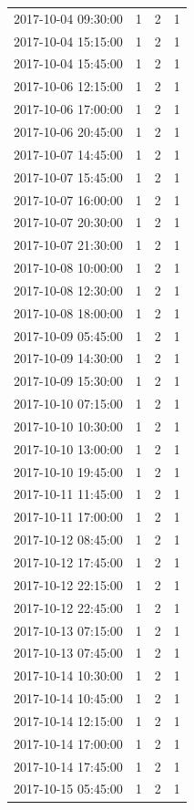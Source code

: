 \begin{tabular}{lrrr}
2017-10-04 09:30:00 & 1 & 2 & 1 \\
2017-10-04 15:15:00 & 1 & 2 & 1 \\
2017-10-04 15:45:00 & 1 & 2 & 1 \\
2017-10-06 12:15:00 & 1 & 2 & 1 \\
2017-10-06 17:00:00 & 1 & 2 & 1 \\
2017-10-06 20:45:00 & 1 & 2 & 1 \\
2017-10-07 14:45:00 & 1 & 2 & 1 \\
2017-10-07 15:45:00 & 1 & 2 & 1 \\
2017-10-07 16:00:00 & 1 & 2 & 1 \\
2017-10-07 20:30:00 & 1 & 2 & 1 \\
2017-10-07 21:30:00 & 1 & 2 & 1 \\
2017-10-08 10:00:00 & 1 & 2 & 1 \\
2017-10-08 12:30:00 & 1 & 2 & 1 \\
2017-10-08 18:00:00 & 1 & 2 & 1 \\
2017-10-09 05:45:00 & 1 & 2 & 1 \\
2017-10-09 14:30:00 & 1 & 2 & 1 \\
2017-10-09 15:30:00 & 1 & 2 & 1 \\
2017-10-10 07:15:00 & 1 & 2 & 1 \\
2017-10-10 10:30:00 & 1 & 2 & 1 \\
2017-10-10 13:00:00 & 1 & 2 & 1 \\
2017-10-10 19:45:00 & 1 & 2 & 1 \\
2017-10-11 11:45:00 & 1 & 2 & 1 \\
2017-10-11 17:00:00 & 1 & 2 & 1 \\
2017-10-12 08:45:00 & 1 & 2 & 1 \\
2017-10-12 17:45:00 & 1 & 2 & 1 \\
2017-10-12 22:15:00 & 1 & 2 & 1 \\
2017-10-12 22:45:00 & 1 & 2 & 1 \\
2017-10-13 07:15:00 & 1 & 2 & 1 \\
2017-10-13 07:45:00 & 1 & 2 & 1 \\
2017-10-14 10:30:00 & 1 & 2 & 1 \\
2017-10-14 10:45:00 & 1 & 2 & 1 \\
2017-10-14 12:15:00 & 1 & 2 & 1 \\
2017-10-14 17:00:00 & 1 & 2 & 1 \\
2017-10-14 17:45:00 & 1 & 2 & 1 \\
2017-10-15 05:45:00 & 1 & 2 & 1 \\

\end{tabular}
